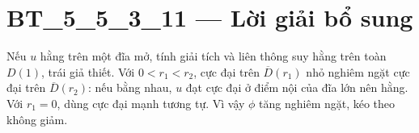 \documentclass[10pt,a4paper]{article}
\begin{document}
\section*{BT\_5\_5\_3\_11 — Lời giải bổ sung}
Nếu $u$ hằng trên một đĩa mở, tính giải tích và liên thông suy hằng trên toàn $D(1)$, trái giả thiết. Với $0<r_1<r_2$, cực đại trên $\overline D(r_1)$ nhỏ nghiêm ngặt cực đại trên $\overline D(r_2)$: nếu bằng nhau, $u$ đạt cực đại ở điểm nội của đĩa lớn nên hằng. Với $r_1=0$, dùng cực đại mạnh tương tự. Vì vậy $\phi$ tăng nghiêm ngặt, kéo theo không giảm.
\end{document}
